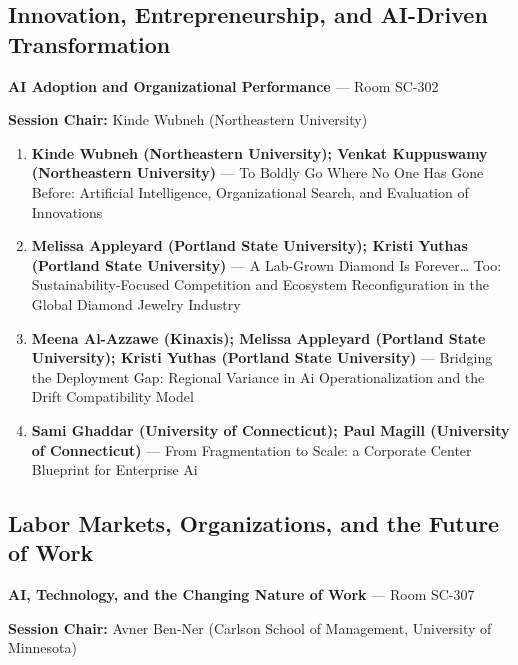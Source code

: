 \documentclass[
  10pt,
  letterpaper,
  DIV=11,
  numbers=noendperiod]{scrartcl}
\begin{document}
\subsection{\texorpdfstring{\textcolor{innovation}{Innovation, Entrepreneurship, and AI-Driven Transformation}}{}}\label{section-55}

\textbf{AI Adoption and Organizational Performance} --- Room SC-302

\textbf{Session Chair:} Kinde Wubneh (Northeastern University)

\begin{enumerate}
\def\labelenumi{\arabic{enumi}.}
\item
  \textbf{Kinde Wubneh (Northeastern University); Venkat Kuppuswamy
  (Northeastern University)} --- To Boldly Go Where No One Has Gone
  Before: Artificial Intelligence, Organizational Search, and Evaluation
  of Innovations
\item
  \textbf{Melissa Appleyard (Portland State University); Kristi Yuthas
  (Portland State University)} --- A Lab-Grown Diamond Is
  Forever\ldots{} Too: Sustainability-Focused Competition and Ecosystem
  Reconfiguration in the Global Diamond Jewelry Industry
\item
  \textbf{Meena Al-Azzawe (Kinaxis); Melissa Appleyard (Portland State
  University); Kristi Yuthas (Portland State University)} --- Bridging
  the Deployment Gap: Regional Variance in Ai Operationalization and the
  Drift Compatibility Model
\item
  \textbf{Sami Ghaddar (University of Connecticut); Paul Magill
  (University of Connecticut)} --- From Fragmentation to Scale: a
  Corporate Center Blueprint for Enterprise Ai
\end{enumerate}

\subsection{\texorpdfstring{\textcolor{labor}{Labor Markets, Organizations, and the Future of Work}}{}}\label{section-56}

\textbf{AI, Technology, and the Changing Nature of Work} --- Room SC-307

\textbf{Session Chair:} Avner Ben-Ner (Carlson School of Management,
University of Minnesota)
\end{document}
